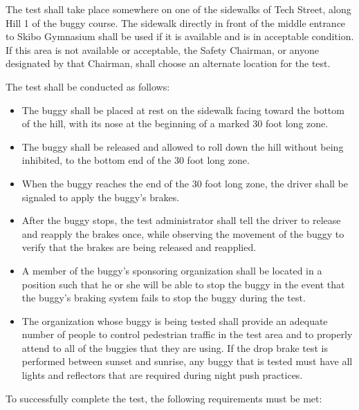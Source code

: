 	The test shall take place somewhere on one of the sidewalks of Tech Street,
	along Hill 1 of the buggy course. The sidewalk directly in front of the middle
	entrance to Skibo Gymnasium shall be used if it is available and is in
	acceptable condition. If this area is not available or acceptable, the Safety
	Chairman, or anyone designated by that Chairman, shall choose an alternate
	location for the test.
	\newline

	\noindent The test shall be conducted as follows:

	\begin{itemize}

		\item
		The buggy shall be placed at rest on the sidewalk facing toward the bottom of
		the hill, with its nose at the beginning of a marked 30 foot long zone.

		\item
		The buggy shall be released and allowed to roll down the hill without being
		inhibited, to the bottom end of the 30 foot long zone.

		\item
		When the buggy reaches the end of the 30 foot long zone, the driver shall be
		signaled to apply the buggy's brakes.

		\item
		After the buggy stops, the test administrator shall tell the driver to release
		and reapply the brakes once, while observing the movement of the buggy to
		verify that the brakes are being released and reapplied.

		\item
		A member of the buggy's sponsoring organization shall be located in a position
		such that he or she will be able to stop the buggy in the event that the
		buggy's braking system fails to stop the buggy during the test.

		\item
		The organization whose buggy is being tested shall provide an adequate number
		of people to control pedestrian traffic in the test area and to properly attend
		to all of the buggies that they are using. If the drop brake test is performed
		between sunset and sunrise, any buggy that is tested must have all lights and
		reflectors that are required during night push practices.

	\end{itemize}

	\noindent To successfully complete the test, the following requirements must be met:

